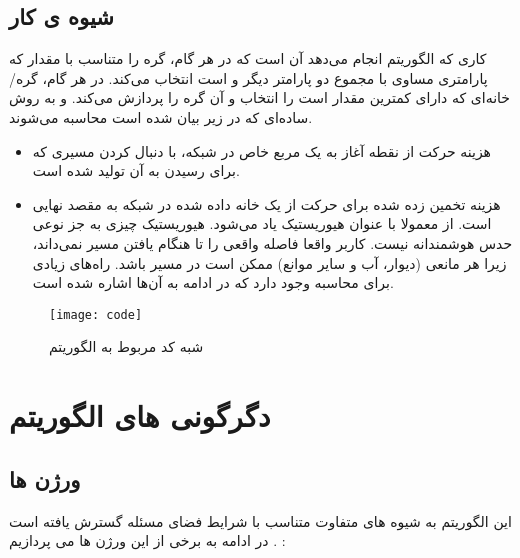 \section{شیوه ی کار}
کاری که الگوریتم  انجام می‌دهد آن است که در هر گام، گره را متناسب با مقدار 
که پارامتری مساوی با مجموع دو پارامتر دیگر  و  است انتخاب می‌کند. در هر گام، گره/خانه‌ای که دارای کمترین مقدار است را انتخاب و آن گره را پردازش می‌کند.  و  به روش ساده‌ای که در زیر بیان شده است محاسبه می‌شوند.
\begin{itemize}
	\item{}
	 هزینه حرکت از نقطه آغاز به یک مربع خاص در شبکه، با دنبال کردن مسیری که برای رسیدن به آن تولید شده است.
		\item{}
		 هزینه تخمین زده شده برای حرکت از یک خانه داده شده در شبکه به مقصد نهایی است. از  معمولا با عنوان هیوریستیک یاد می‌شود. هیوریستیک چیزی به جز نوعی حدس هوشمندانه نیست. کاربر واقعا فاصله واقعی را تا هنگام یافتن مسیر نمی‌داند، زیرا هر مانعی (دیوار، آب و سایر موانع) ممکن است در مسیر باشد. راه‌های زیادی برای محاسبه  وجود دارد که در ادامه به آن‌ها اشاره شده است.
\end{itemize}
\begin{figure}[h]
	\texttt{[image: code]}
	\centering
	\caption{ شبه کد مربوط به الگوریتم }
	\cite{paliwal2023survey}
	\label{improved}
\end{figure}
\chapter{دگرگونی های الگوریتم }
\section{ورژن ها}
این الگوریتم به شیوه های متفاوت متناسب با شرایط فضای مسئله گسترش یافته است . در ادامه به برخی از این ورژن ها می پردازیم :






